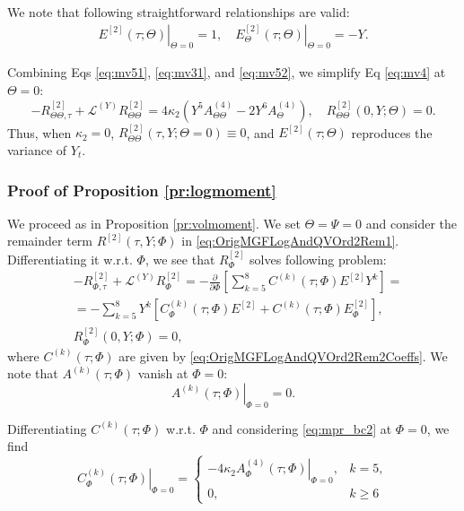 \documentclass[pdftex,11pt,a4paper] {article}
\begin{document}
We note that following straightforward relationships are valid:
\begin{equation}\label{eq:mv52}
\begin{split}
\left.E^{[2]}(\tau;\Theta)\right|_{\Theta=0}=1, \quad 
\left.E_{\Theta}^{[2]}(\tau;\Theta)\right|_{\Theta=0}=-Y.
\end{split}
\end{equation}

Combining Eqs \eqref{eq:mv51}, \eqref{eq:mv31}, and \eqref{eq:mv52}, we simplify Eq \eqref{eq:mv4} at $\Theta=0$:
\begin{equation}\label{eq:mv6}
-R_{\Theta\Theta,\tau}^{[2]}+\mathcal{L}^{(Y)}R_{\Theta\Theta}^{[2]}=4\kappa_2\left(Y^5 A_{\Theta\Theta}^{(4)}-2Y^6 A_{\Theta}^{(4)}\right),\quad 
R_{\Theta\Theta}^{[2]}(0,Y;\Theta)=0.
\end{equation}
Thus, when $\kappa_2=0$, $R_{\Theta\Theta}^{[2]}(\tau,Y;\Theta=0)\equiv 0$, and $E^{[2]}(\tau; \Theta)$ reproduces the variance of $Y_t$. 




\subsubsection{Proof of Proposition \ref{pr:logmoment}}\label{app:logmoment}


We proceed as in Proposition \ref{pr:volmoment}. We set $\Theta=\Psi=0$ and consider the remainder term $R^{[2]}(\tau, Y;\Phi)$ in \eqref{eq:OrigMGFLogAndQVOrd2Rem1}. 
Differentiating it w.r.t. $\Phi$, we see that $R_{\Phi}^{[2]}$ solves following problem:
\begin{equation}\label{eq:mpr3}
\begin{split}
&-R_{\Phi,\tau}^{[2]}+\mathcal{L}^{(Y)}R_{\Phi}^{[2]}=
-\frac{\partial}{\partial\Phi}\left[\sum_{k=5}^8C^{(k)}(\tau;\Phi)E^{[2]}Y^k\right]=\\
&=-\sum_{k=5}^8Y^k \left[C_{\Phi}^{(k)}(\tau;\Phi)E^{[2]}+ C^{(k)}(\tau;\Phi)E^{[2]}_{\Phi}\right],\\
& R_{\Phi}^{[2]}(0,Y;\Phi)=0,
\end{split}
\end{equation}
where $C^{(k)}(\tau;\Phi)$ are given by \eqref{eq:OrigMGFLogAndQVOrd2Rem2Coeffs}. We note that $A^{(k)}(\tau; \Phi)$ vanish at $\Phi=0$:
\begin{equation}\label{eq:mpr_bc2}
\left.A^{(k)}(\tau; \Phi)\right|_{\Phi=0}=0.
\end{equation}

Differentiating $C^{(k)}(\tau;\Phi)$ w.r.t. $\Phi$ and considering \eqref{eq:mpr_bc2} at $\Phi=0$, we find
\begin{equation}\label{eq:mpr31}
\left.C^{(k)}_{\Phi}(\tau; \Phi)\right|_{\Phi=0}=
\begin{cases}
-4\kappa_2 \left. A^{(4)}_{\Phi}(\tau; \Phi)\right|_{\Phi=0}, & k=5,\\
0, & k\ge 6
\end{cases}
\end{equation}
\end{document}
